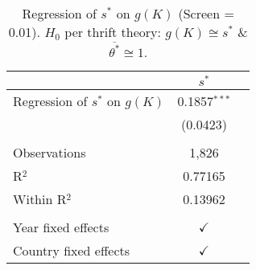 \begin{table}[pos=h]
\caption{Regression of \(s^*\) on \(g(K)\) (Screen = 0.01). \(H_0\) per thrift theory: \(g(K) \cong s^*\) \& \(\overline{\theta^*} \cong 1\).}
\centering
\begin{tabularx}{\columnwidth}{lcc}
   \toprule
                                     & $s^*$ \\   
   \midrule 
   Regression of $s^*$ on \(g(K)\)   & 0.1857$^{***}$\\   
                                     & (0.0423)\\   
    \\
   Observations                      & 1,826\\  
   R$^2$                             & 0.77165\\  
   Within R$^2$                      & 0.13962\\  
    \\
   Year fixed effects                & $\checkmark$\\   
   Country fixed effects             & $\checkmark$\\   
   \bottomrule
\end{tabularx}
   \label{tbl-4}
\end{table}